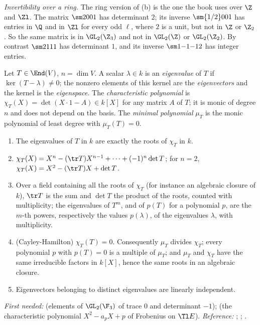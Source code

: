 \emph{Invertibility over a ring.} The ring version of (b) is the one the book uses over $\Z$ and
$\Zl$. The matrix $\sm2001$ has determinant $2$; its inverse $\sm{1/2}001$ has entries in $\Q$ and
in $\Zl$ for every odd $\ell$, where $2$ is a unit, but not in $\Z$ or $\Z_2$. So the same matrix is
in $\GL_2(\Z_3)$ and not in $\GL_2(\Z)$ or $\GL_2(\Z_2)$. By contrast $\sm2111$ has determinant $1$,
and its inverse $\sm1{-1}{-1}2$ has integer entries.

\begin{definition}\label{def:prereq:eigen}
Let $T\in\End(V)$, $n=\dim V$. A scalar $\lambda\in k$ is an \emph{eigenvalue} of $T$ if
$\ker(T-\lambda)\ne0$; the nonzero elements of this kernel are the \emph{eigenvectors} and the
kernel is the \emph{eigenspace}. The \emph{characteristic polynomial} is
$\chi_T(X)=\det(X\cdot1-A)\in k[X]$ for any matrix $A$ of $T$; it is monic of degree $n$ and does
not depend on the basis. The \emph{minimal polynomial} $\mu_T$ is the monic polynomial of least
degree with $\mu_T(T)=0$.
\end{definition}

\begin{theorem}\label{thm:prereq:eigen}
\begin{enumerate}[label=(\alph*)]
\item The eigenvalues of $T$ in $k$ are exactly the roots of $\chi_T$ in $k$.
\item $\chi_T(X)=X^n-(\tr T)X^{n-1}+\dots+(-1)^n\det T$; for $n=2$,
$\chi_T(X)=X^2-(\tr T)X+\det T$.
\item Over a field containing all the roots of $\chi_T$ (for instance an algebraic closure of $k$),
$\tr T$ is the sum and $\det T$ the product of the roots, counted with multiplicity; the
eigenvalues of $T^m$, and of $p(T)$ for a polynomial $p$, are the $m$-th powers, respectively the
values $p(\lambda)$, of the eigenvalues $\lambda$, with multiplicity.
\item (Cayley-Hamilton) $\chi_T(T)=0$. Consequently $\mu_T$ divides $\chi_T$; every polynomial
$p$ with $p(T)=0$ is a multiple of $\mu_T$; and $\mu_T$ and $\chi_T$ have the same irreducible
factors in $k[X]$, hence the same roots in an algebraic closure.
\item Eigenvectors belonging to distinct eigenvalues are linearly independent.
\end{enumerate}
\end{theorem}
\noindent\emph{First needed:}  (elements of $\GL_2(\F_3)$ of trace $0$ and
determinant $-1$);  (the characteristic polynomial $X^2-a_pX+p$ of Frobenius on
$\Tl E$). \emph{Reference:} \cite[Chapters 5 and 8]{Axler15}; \cite[Chapter XIV]{Lang};
\cite[Section 12.2]{DummitFoote}.

